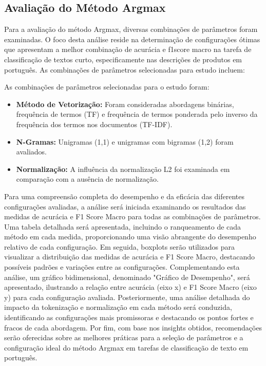 \subsection{Avaliação do Método Argmax}

Para a avaliação do método Argmax, diversas combinações de parâmetros foram examinadas. O foco desta análise reside na determinação de configurações ótimas que apresentam a melhor combinação de acurácia e f1score macro na tarefa de classificação de textos curto, especificamente nas descrições de produtos em português. As combinações de parâmetros selecionadas para estudo incluem:

As combinações de parâmetros selecionadas para o estudo foram:

\begin{itemize}
    \item \textbf{Método de Vetorização:} Foram consideradas abordagens binárias, frequência de termos (TF) e frequência de termos ponderada pelo inverso da frequência dos termos nos documentos (TF-IDF).
    \item \textbf{N-Gramas:} Unigramas (1,1) e unigramas com bigramas (1,2) foram avaliados.
    \item \textbf{Normalização:} A influência da normalização L2 foi examinada em comparação com a ausência de normalização.
\end{itemize}

Para uma compreensão completa do desempenho e da eficácia das diferentes configurações avaliadas, a análise será iniciada examinando os resultados das medidas de acurácia e F1 Score Macro para todas as combinações de parâmetros. Uma tabela detalhada será apresentada, incluindo o ranqueamento de cada método em cada medida, proporcionando uma visão abrangente do desempenho relativo de cada configuração. Em seguida, boxplots serão utilizados para visualizar a distribuição das medidas de acurácia e F1 Score Macro, destacando possíveis padrões e variações entre as configurações. Complementando esta análise, um gráfico bidimensional, denominado "Gráfico de Desempenho", será apresentado, ilustrando a relação entre acurácia (eixo x) e F1 Score Macro (eixo y) para cada configuração avaliada. Posteriormente, uma análise detalhada do impacto da tokenização e normalização em cada método será conduzida, identificando as configurações mais promissoras e destacando os pontos fortes e fracos de cada abordagem. Por fim, com base nos insights obtidos, recomendações serão oferecidas sobre as melhores práticas para a seleção de parâmetros e a configuração ideal do método Argmax em tarefas de classificação de texto em português.

